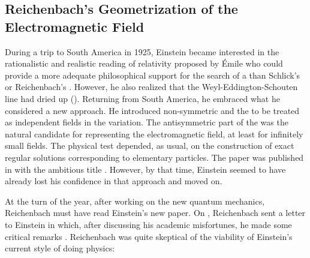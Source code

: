 \documentclass[final]{article}
\begin{document}
\subsection{Reichenbach's Geometrization of the Electromagnetic Field}
%
During a trip to South America in 1925, Einstein became interested in the rationalistic and realistic reading of relativity proposed by \'Emile   who could provide a more adequate philosophical support for the search of a \uft than Schlick's or Reichenbach's  \cite{Giovanelli2018a}. However, he also realized that the Weyl-Eddington-Schouten line had dried up (). Returning from South America, he embraced what he considered a new approach. He introduced non-symmetric \Gtmn and the \gmn to be treated as independent fields in the variation. The antisymmetric part of the \gmn was the natural candidate for representing the electromagnetic field, at least for infinitely small fields. The physical test depended, as usual, on the construction of exact regular solutions corresponding to elementary particles. The paper was published in  with the ambitious title   \citep{Einstein1925a}. However, by that time, Einstein seemed to have already lost his confidence in that approach and moved on.

At the turn of the year, after working on the new quantum mechanics, Reichenbach must have read Einstein's new paper. On , Reichenbach sent a letter to Einstein in which, after discussing his academic misfortunes, he made some critical remarks \citep{Einstein1925a}. Reichenbach was quite skeptical of the viability of Einstein's current style of doing physics:
\end{document}
